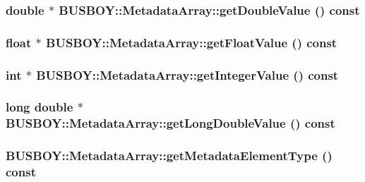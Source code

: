 \label{classBUSBOY_1_1MetadataArray_a10840e6a5a0cbfbcca61018e2f682e07}
\hypertarget{classBUSBOY_1_1MetadataArray_a23ceda933467b3a4859b6981d83c3801}{
\subsubsection[{getDoubleValue}]{\setlength{\rightskip}{0pt plus 5cm}double $\ast$ BUSBOY::MetadataArray::getDoubleValue () const}}
\label{classBUSBOY_1_1MetadataArray_a23ceda933467b3a4859b6981d83c3801}
\hypertarget{classBUSBOY_1_1MetadataArray_a3668eb3c0fb08d7e068d9649100be819}{
\subsubsection[{getFloatValue}]{\setlength{\rightskip}{0pt plus 5cm}float $\ast$ BUSBOY::MetadataArray::getFloatValue () const}}
\label{classBUSBOY_1_1MetadataArray_a3668eb3c0fb08d7e068d9649100be819}
\hypertarget{classBUSBOY_1_1MetadataArray_a1ae06cfee955bd447843cdfc298b76d7}{
\subsubsection[{getIntegerValue}]{\setlength{\rightskip}{0pt plus 5cm}int $\ast$ BUSBOY::MetadataArray::getIntegerValue () const}}
\label{classBUSBOY_1_1MetadataArray_a1ae06cfee955bd447843cdfc298b76d7}
\hypertarget{classBUSBOY_1_1MetadataArray_ad0379652fdd47dc55e097db4e3cfe957}{
\subsubsection[{getLongDoubleValue}]{\setlength{\rightskip}{0pt plus 5cm}long double $\ast$ BUSBOY::MetadataArray::getLongDoubleValue () const}}
\label{classBUSBOY_1_1MetadataArray_ad0379652fdd47dc55e097db4e3cfe957}
\hypertarget{classBUSBOY_1_1MetadataArray_af8706944f1dd70088aca6edfa0b9b4dd}{
\subsubsection[{getMetadataElementType}]{ BUSBOY::MetadataArray::getMetadataElementType () const}}
\label{classBUSBOY_1_1MetadataArray_af8706944f1dd70088aca6edfa0b9b4dd}


